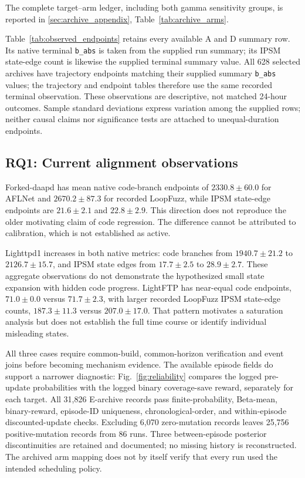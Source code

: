 \documentclass[final,5p,times,number]{elsarticle}
\newcommand{\figref}[1]{Fig.~\ref{#1}}
\begin{document}

The complete target--arm ledger, including both gamma sensitivity groups, is reported in \ref{sec:archive_appendix}, Table~\ref{tab:archive_arms}.

Table~\ref{tab:observed_endpoints} retains every available A and D summary row. Its native terminal \texttt{b\_abs} is taken from the supplied run summary; its IPSM state-edge count is likewise the supplied terminal summary value. All 628 selected archives have trajectory endpoints matching their supplied summary \texttt{b\_abs} values; the trajectory and endpoint tables therefore use the same recorded terminal observation. These observations are descriptive, not matched 24-hour outcomes. Sample standard deviations express variation among the supplied rows; neither causal claims nor significance tests are attached to unequal-duration endpoints.

\subsection{RQ1: Current alignment observations}
Forked-daapd has mean native code-branch endpoints of $2330.8\pm60.0$ for AFLNet and $2670.2\pm87.3$ for recorded LoopFuzz, while IPSM state-edge endpoints are $21.6\pm2.1$ and $22.8\pm2.9$. This direction does not reproduce the older motivating claim of code regression. The difference cannot be attributed to calibration, which is not established as active.

Lighttpd1 increases in both native metrics: code branches from $1940.7\pm21.2$ to $2126.7\pm15.7$, and IPSM state edges from $17.7\pm2.5$ to $28.9\pm2.7$. These aggregate observations do not demonstrate the hypothesized small state expansion with hidden code progress. LightFTP has near-equal code endpoints, $71.0\pm0.0$ versus $71.7\pm2.3$, with larger recorded LoopFuzz IPSM state-edge counts, $187.3\pm11.3$ versus $207.0\pm17.0$. That pattern motivates a saturation analysis but does not establish the full time course or identify individual misleading states.

All three cases require common-build, common-horizon verification and event joins before becoming mechanism evidence. The available episode fields do support a narrower diagnostic: \figref{fig:reliability} compares the logged pre-update probabilities with the logged binary coverage-save reward, separately for each target. All 31,826 E-archive records pass finite-probability, Beta-mean, binary-reward, episode-ID uniqueness, chronological-order, and within-episode discounted-update checks. Excluding 6,070 zero-mutation records leaves 25,756 positive-mutation records from 86 runs. Three between-episode posterior discontinuities are retained and documented; no missing history is reconstructed. The archived arm mapping does not by itself verify that every run used the intended scheduling policy.
\end{document}
